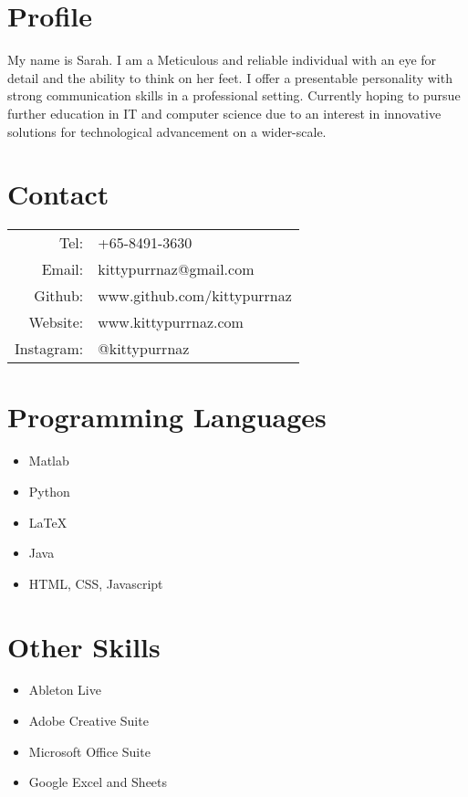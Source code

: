\documentclass[11pt,oneside,a4paper,titlepage]{article}
\begin{document}
\begin{tcolorbox}
\begin{minipage}[t]{8cm}
\vspace*{-0.5cm}
\begin{tcolorbox}[grow to left by=0.6cm,colback=gray!25,colframe=white]
\section*{Profile}
My name is Sarah. I am a Meticulous and reliable individual with an eye for detail and the ability to think on her feet. I offer a presentable personality with strong communication skills in a professional setting. Currently hoping to pursue further education in IT and computer science due to an interest in innovative solutions for technological advancement on a wider-scale.
\section*{Contact}
\begin{tabular}{r l}
Tel: & +65-8491-3630 \\
Email: & kittypurrnaz@gmail.com \\
Github: & www.github.com/kittypurrnaz \\
Website: & www.kittypurrnaz.com \\ 
Instagram: & @kittypurrnaz \\
\end{tabular}
\section*{Programming Languages}
\begin{itemize}
    \item {Matlab}
    \item {Python}
    \item {LaTeX}
    \item {Java}
    \item {HTML, CSS, Javascript}
\end{itemize}
\section*{Other Skills}
\begin{itemize}
    \item {Ableton Live}
    \item {Adobe Creative Suite}
    \item {Microsoft Office Suite}
    \item {Google Excel and Sheets}
\end{itemize}

\end{tcolorbox}
\end{minipage}
\end{tcolorbox}
\end{document}
